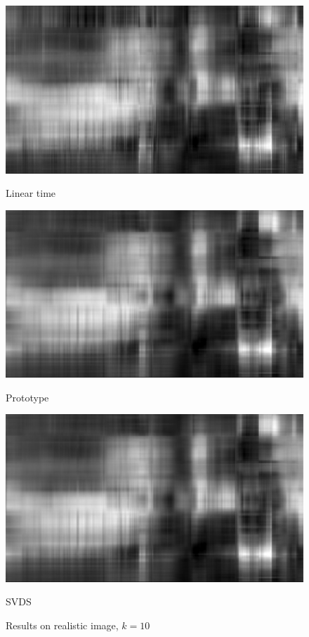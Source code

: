 \documentclass{article}
\begin{document}
\begin{figure}[p]
	\begin{minipage}{0.33\linewidth}
		\centering
		\includegraphics[width=1\linewidth]{./fig/image_rec11.jpeg}
		\caption{Linear time}
	\end{minipage}
	\begin{minipage}{0.33\linewidth}
		\centering
		\includegraphics[width=1\linewidth]{./fig/image_rec12.jpeg}
		\caption{Prototype}
	\end{minipage}
    \begin{minipage}{0.33\linewidth}
		\centering
		\includegraphics[width=1\linewidth]{./fig/image_rec13.jpeg}
		\caption{SVDS }
	\end{minipage}
	\caption*{Results on realistic image, $k=10$}
\end{figure} 
\end{document}
